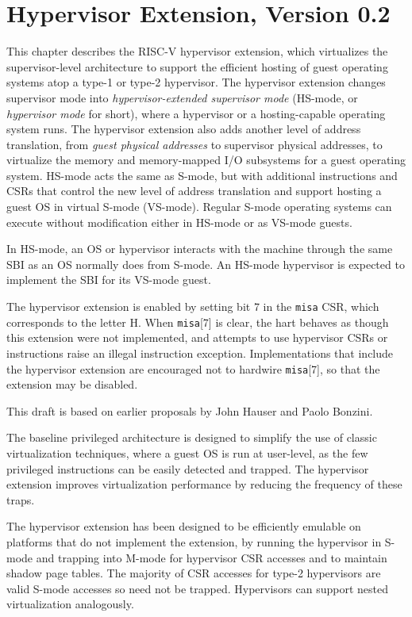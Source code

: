 \chapter{Hypervisor Extension, Version 0.2}
\label{hypervisor}

This chapter describes the RISC-V hypervisor extension, which virtualizes the
supervisor-level architecture to support the efficient hosting of guest
operating systems atop a type-1 or type-2 hypervisor.
The hypervisor extension changes supervisor mode into
{\em hypervisor-extended supervisor mode} (HS-mode, or {\em hypervisor
mode} for short), where a hypervisor or a hosting-capable operating system
runs.  The hypervisor extension also adds another level of address translation,
from {\em guest physical addresses} to supervisor physical addresses,
to virtualize the
memory and memory-mapped I/O subsystems for a guest operating system.  HS-mode
acts the same as S-mode, but with additional instructions and CSRs that control
the new level of address translation and support hosting a guest OS in virtual
S-mode (VS-mode).
Regular S-mode operating systems can execute without modification either in
HS-mode or as VS-mode guests.

In HS-mode, an OS or hypervisor interacts with the machine through the same
SBI as an OS normally does from S-mode.  An HS-mode hypervisor is expected to
implement the SBI for its VS-mode guest.

The hypervisor extension is enabled by setting bit 7 in the {\tt misa} CSR,
which corresponds to the letter H.  When {\tt misa}[7] is clear, the hart
behaves as though this extension were not implemented, and attempts to use
hypervisor CSRs or instructions raise an illegal instruction exception.
Implementations that include the hypervisor extension are encouraged
not to hardwire {\tt misa}[7], so that the extension may be disabled.

\begin{commentary}
This draft is based on earlier proposals by John Hauser and Paolo Bonzini.
\end{commentary}

\begin{commentary}
The baseline privileged architecture is designed to simplify the use of classic
virtualization techniques, where a guest OS is run at user-level, as
the few privileged instructions can be easily detected and trapped.
The hypervisor extension improves virtualization performance by
reducing the frequency of these traps.

The hypervisor extension has been designed to be efficiently
emulable on platforms that do not implement the extension, by running
the hypervisor in S-mode and trapping into M-mode for hypervisor CSR accesses
and to maintain shadow page tables.  The majority of CSR accesses for
type-2 hypervisors are valid S-mode accesses so need not be trapped.
Hypervisors can support nested virtualization analogously.
\end{commentary}

